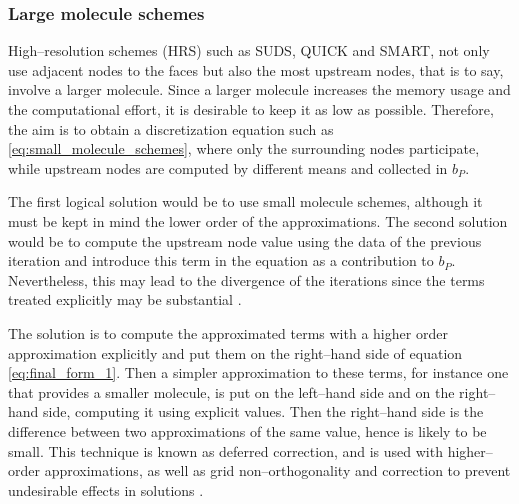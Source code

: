 
\subsubsection{Large molecule schemes}

High--resolution schemes (HRS) such as SUDS, QUICK and SMART, not only use
adjacent nodes to the faces but also the most upstream nodes, that is to say,
involve a larger molecule. Since a larger molecule increases the memory usage
and the computational effort, it is desirable to keep it as low as possible.
Therefore, the aim is to obtain a discretization equation such as
\eqref{eq:small_molecule_schemes}, where only the surrounding nodes
participate, while upstream nodes are computed by different means and collected
in $b_P$. 

The first logical solution would be to use small molecule schemes, although it
must be kept in mind the lower order of the approximations. The second solution
would be to compute the upstream node value using the data of the previous
iteration and introduce this term in the equation as a contribution to $b_P$.
Nevertheless, this may lead to the divergence of the iterations since the terms
treated explicitly may be substantial \cite{ferziger2002computational5deferred}.


The solution is to compute the approximated terms with a higher order
approximation explicitly and put them on the right--hand side of equation
\eqref{eq:final_form_1}. Then a simpler approximation to these terms, for
instance one that provides a smaller molecule, is put on the left--hand side and
on the right--hand side, computing it using explicit values. Then the
right--hand side is the difference between two approximations of the same value,
hence is likely to be small. This technique is known as deferred correction, and
is used with higher--order approximations, as well as grid non--orthogonality
and correction to prevent undesirable effects in solutions
\cite{ferziger2002computational5deferred}.

